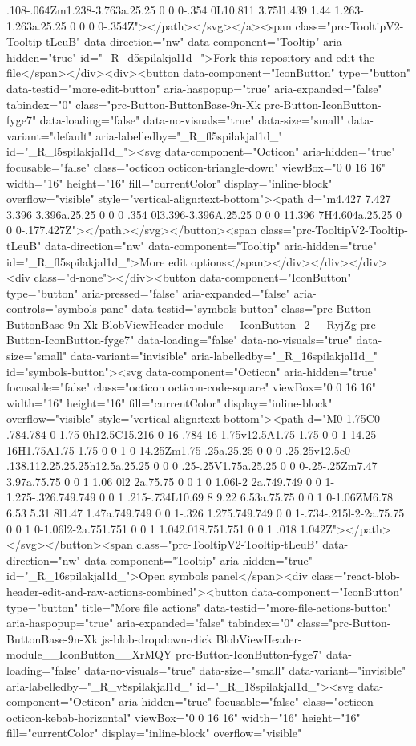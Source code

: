 {{{{{.108-.064Zm1.238-3.763a.25.25 0 0 0-.354 0L10.811 3.75l1.439 1.44 1.263-1.263a.25.25 0 0 0 0-.354Z"></path></svg></a><span class="prc-TooltipV2-Tooltip-tLeuB" data-direction="nw" data-component="Tooltip" aria-hidden="true" id="_R_d5spilakjal1d_">Fork this repository and edit the file</span></div><div><button data-component="IconButton" type="button" data-testid="more-edit-button" aria-haspopup="true" aria-expanded="false" tabindex="0" class="prc-Button-ButtonBase-9n-Xk prc-Button-IconButton-fyge7" data-loading="false" data-no-visuals="true" data-size="small" data-variant="default" aria-labelledby="_R_fl5spilakjal1d_" id="_R_l5spilakjal1d_"><svg data-component="Octicon" aria-hidden="true" focusable="false" class="octicon octicon-triangle-down" viewBox="0 0 16 16" width="16" height="16" fill="currentColor" display="inline-block" overflow="visible" style="vertical-align:text-bottom"><path d="m4.427 7.427 3.396 3.396a.25.25 0 0 0 .354 0l3.396-3.396A.25.25 0 0 0 11.396 7H4.604a.25.25 0 0 0-.177.427Z"></path></svg></button><span class="prc-TooltipV2-Tooltip-tLeuB" data-direction="nw" data-component="Tooltip" aria-hidden="true" id="_R_fl5spilakjal1d_">More edit options</span></div></div></div><div class="d-none"></div><button data-component="IconButton" type="button" aria-pressed="false" aria-expanded="false" aria-controls="symbols-pane" data-testid="symbols-button" class="prc-Button-ButtonBase-9n-Xk BlobViewHeader-module__IconButton_2__RyjZg prc-Button-IconButton-fyge7" data-loading="false" data-no-visuals="true" data-size="small" data-variant="invisible" aria-labelledby="_R_16spilakjal1d_" id="symbols-button"><svg data-component="Octicon" aria-hidden="true" focusable="false" class="octicon octicon-code-square" viewBox="0 0 16 16" width="16" height="16" fill="currentColor" display="inline-block" overflow="visible" style="vertical-align:text-bottom"><path d="M0 1.75C0 .784.784 0 1.75 0h12.5C15.216 0 16 .784 16 1.75v12.5A1.75 1.75 0 0 1 14.25 16H1.75A1.75 1.75 0 0 1 0 14.25Zm1.75-.25a.25.25 0 0 0-.25.25v12.5c0 .138.112.25.25.25h12.5a.25.25 0 0 0 .25-.25V1.75a.25.25 0 0 0-.25-.25Zm7.47 3.97a.75.75 0 0 1 1.06 0l2 2a.75.75 0 0 1 0 1.06l-2 2a.749.749 0 0 1-1.275-.326.749.749 0 0 1 .215-.734L10.69 8 9.22 6.53a.75.75 0 0 1 0-1.06ZM6.78 6.53 5.31 8l1.47 1.47a.749.749 0 0 1-.326 1.275.749.749 0 0 1-.734-.215l-2-2a.75.75 0 0 1 0-1.06l2-2a.751.751 0 0 1 1.042.018.751.751 0 0 1 .018 1.042Z"></path></svg></button><span class="prc-TooltipV2-Tooltip-tLeuB" data-direction="nw" data-component="Tooltip" aria-hidden="true" id="_R_16spilakjal1d_">Open symbols panel</span><div class="react-blob-header-edit-and-raw-actions-combined"><button data-component="IconButton" type="button" title="More file actions" data-testid="more-file-actions-button" aria-haspopup="true" aria-expanded="false" tabindex="0" class="prc-Button-ButtonBase-9n-Xk js-blob-dropdown-click BlobViewHeader-module__IconButton__XrMQY prc-Button-IconButton-fyge7" data-loading="false" data-no-visuals="true" data-size="small" data-variant="invisible" aria-labelledby="_R_v8spilakjal1d_" id="_R_18spilakjal1d_"><svg data-component="Octicon" aria-hidden="true" focusable="false" class="octicon octicon-kebab-horizontal" viewBox="0 0 16 16" width="16" height="16" fill="currentColor" display="inline-block" overflow="visible" }}}}}
